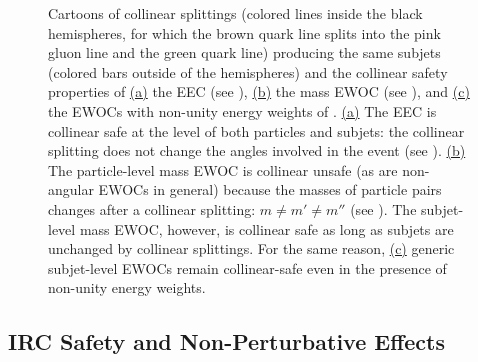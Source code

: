 \begin{figure}[t!]
{    }
    \caption[Cartoons of collinear splittings showcasing the collinear safety properties of EWOCs and the EEC.]{
        Cartoons of collinear splittings (colored lines inside the black hemispheres, for which the brown quark line splits into the pink gluon line and the green quark line) producing the same subjets (colored bars outside of the hemispheres) and the collinear safety properties of
        \hyperref[fig:EWOCs:cartoon:angle_irc]{(a)}
        the EEC (see ),
        \hyperref[fig:EWOCs:cartoon:mass_irc]{(b)}
        the mass EWOC (see ), and
        \hyperref[fig:EWOCs:cartoon:energyweight_irc]{(c)} the EWOCs with non-unity energy weights of .
        \hyperref[fig:EWOCs:cartoon:angle_irc]{(a)}
        The EEC is collinear safe at the level of both particles and subjets:
        the collinear splitting does not change the angles involved in the event (see ).
        \hyperref[fig:EWOCs:cartoon:mass_irc]{(b)}
        The particle-level mass EWOC is collinear unsafe (as are non-angular EWOCs in general) because the masses of particle pairs changes after a collinear splitting:
        \(m \neq m' \neq m''\) (see ).
        The subjet-level mass EWOC, however, is collinear safe as long as subjets are unchanged by collinear splittings.
        For the same reason, \hyperref[fig:EWOCs:cartoon:energyweight_irc]{(c)} generic subjet-level EWOCs remain collinear-safe even in the presence of non-unity energy weights.
    }
    \label{fig:EWOCs:cartoon:particle_irc}
\end{figure}


\subsection{IRC Safety and Non-Perturbative Effects}
\label{sec:ewoc-irc}


